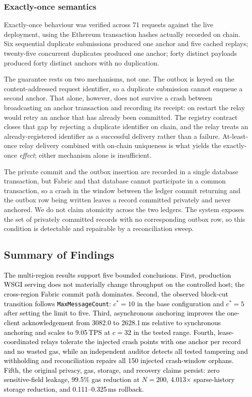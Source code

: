 \documentclass[final,5p,times,twocolumn]{elsarticle}
\begin{document}
\subsubsection*{\textbf{Exactly-once semantics}}
Exactly-once behaviour was verified across 71 requests against the live
deployment, using the Ethereum transaction hashes actually recorded on chain.
Six sequential duplicate submissions produced one anchor and five cached
replays; twenty-five concurrent duplicates produced one anchor; forty distinct
payloads produced forty distinct anchors with no duplication.

The guarantee rests on two mechanisms, not one. The outbox is keyed on the
content-addressed request identifier, so a duplicate submission cannot enqueue a
second anchor. That alone, however, does not survive a crash between broadcasting
an anchor transaction and recording its receipt: on restart the relay would
retry an anchor that has already been committed. The registry contract closes
that gap by rejecting a duplicate identifier on chain, and the relay treats an
already-registered identifier as a successful delivery rather than a failure.
At-least-once relay delivery combined with on-chain uniqueness is what yields
the exactly-once \emph{effect}; either mechanism alone is insufficient.

The private commit and the outbox insertion are recorded in a single database
transaction, but Fabric and that database cannot participate in a common
transaction, so a crash in the window between the ledger commit returning and
the outbox row being written leaves a record committed privately and never
anchored. We do not claim atomicity across the two ledgers. The system exposes
the set of privately committed records with no corresponding outbox row, so this
condition is detectable and repairable by a reconciliation sweep.

\fi
\subsection{\textbf{Summary of Findings}}
\label{sec:res_summary}

\textcolor{black}{The multi-region results support five bounded conclusions. First, production WSGI serving does not materially change throughput on the controlled host; the cross-region Fabric commit path dominates. Second, the observed block-cut transition follows \texttt{MaxMessageCount}: $c^*=10$ in the base configuration and $c^*=5$ after setting the limit to five. Third, asynchronous anchoring improves the one-client acknowledgement from 3082.0 to 2628.1\,ms relative to synchronous anchoring and scales to 9.05\,TPS at $c=32$ in the tested range. Fourth, lease-coordinated relays tolerate the injected crash points with one anchor per record and no wasted gas, while an independent auditor detects all tested tampering and withholding and reconciliation repairs all 150 injected crash-window orphans. Fifth, the original privacy, gas, storage, and recovery claims persist: zero sensitive-field leakage, 99.5\% gas reduction at $N=200$, 4.013$\times$ sparse-history storage reduction, and 0.111--0.325\,ms rollback.}
\end{document}
